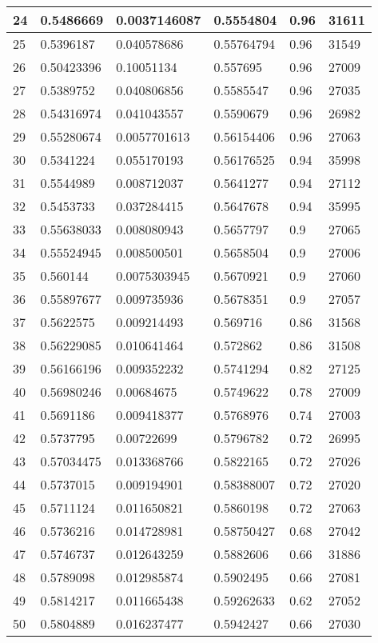 \begin{longtable}{|l|l|l|l|l|l|}
24 & 0.5486669 & 0.0037146087 & 0.5554804 & 0.96 & 31611 \\ \hline 
25 & 0.5396187 & 0.040578686 & 0.55764794 & 0.96 & 31549 \\ \hline 
26 & 0.50423396 & 0.10051134 & 0.557695 & 0.96 & 27009 \\ \hline 
27 & 0.5389752 & 0.040806856 & 0.5585547 & 0.96 & 27035 \\ \hline 
28 & 0.54316974 & 0.041043557 & 0.5590679 & 0.96 & 26982 \\ \hline 
29 & 0.55280674 & 0.0057701613 & 0.56154406 & 0.96 & 27063 \\ \hline 
30 & 0.5341224 & 0.055170193 & 0.56176525 & 0.94 & 35998 \\ \hline 
31 & 0.5544989 & 0.008712037 & 0.5641277 & 0.94 & 27112 \\ \hline 
32 & 0.5453733 & 0.037284415 & 0.5647678 & 0.94 & 35995 \\ \hline 
33 & 0.55638033 & 0.008080943 & 0.5657797 & 0.9 & 27065 \\ \hline 
34 & 0.55524945 & 0.008500501 & 0.5658504 & 0.9 & 27006 \\ \hline 
35 & 0.560144 & 0.0075303945 & 0.5670921 & 0.9 & 27060 \\ \hline 
36 & 0.55897677 & 0.009735936 & 0.5678351 & 0.9 & 27057 \\ \hline 
37 & 0.5622575 & 0.009214493 & 0.569716 & 0.86 & 31568 \\ \hline 
38 & 0.56229085 & 0.010641464 & 0.572862 & 0.86 & 31508 \\ \hline 
39 & 0.56166196 & 0.009352232 & 0.5741294 & 0.82 & 27125 \\ \hline 
40 & 0.56980246 & 0.00684675 & 0.5749622 & 0.78 & 27009 \\ \hline 
41 & 0.5691186 & 0.009418377 & 0.5768976 & 0.74 & 27003 \\ \hline 
42 & 0.5737795 & 0.00722699 & 0.5796782 & 0.72 & 26995 \\ \hline 
43 & 0.57034475 & 0.013368766 & 0.5822165 & 0.72 & 27026 \\ \hline 
44 & 0.5737015 & 0.009194901 & 0.58388007 & 0.72 & 27020 \\ \hline 
45 & 0.5711124 & 0.011650821 & 0.5860198 & 0.72 & 27063 \\ \hline 
46 & 0.5736216 & 0.014728981 & 0.58750427 & 0.68 & 27042 \\ \hline 
47 & 0.5746737 & 0.012643259 & 0.5882606 & 0.66 & 31886 \\ \hline 
48 & 0.5789098 & 0.012985874 & 0.5902495 & 0.66 & 27081 \\ \hline 
49 & 0.5814217 & 0.011665438 & 0.59262633 & 0.62 & 27052 \\ \hline 
50 & 0.5804889 & 0.016237477 & 0.5942427 & 0.66 & 27030 \\ \hline 
\end{longtable}